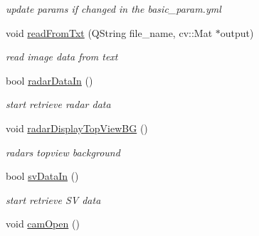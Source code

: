 \begin{DoxyCompactItemize}
\begin{DoxyCompactList}\small\item\em update params if changed in the basic\+\_\+param.\+yml \end{DoxyCompactList}\item 
\hypertarget{class_main_window_ab1ac23ed93488b126a11739c637a85ef}{}void \hyperlink{class_main_window_ab1ac23ed93488b126a11739c637a85ef}{read\+From\+Txt} (Q\+String file\+\_\+name, cv\+::\+Mat $\ast$output)\label{class_main_window_ab1ac23ed93488b126a11739c637a85ef}

\begin{DoxyCompactList}\small\item\em read image data from text \end{DoxyCompactList}\item 
\hypertarget{class_main_window_a4efa6f79ede7fbadc06f39adaa37830b}{}bool \hyperlink{class_main_window_a4efa6f79ede7fbadc06f39adaa37830b}{radar\+Data\+In} ()\label{class_main_window_a4efa6f79ede7fbadc06f39adaa37830b}

\begin{DoxyCompactList}\small\item\em start retrieve radar data \end{DoxyCompactList}\item 
\hypertarget{class_main_window_a76f1215df56775aa51065ee9559739ed}{}void \hyperlink{class_main_window_a76f1215df56775aa51065ee9559739ed}{radar\+Display\+Top\+View\+B\+G} ()\label{class_main_window_a76f1215df56775aa51065ee9559739ed}

\begin{DoxyCompactList}\small\item\em radar\textquotesingle{}s topview background \end{DoxyCompactList}\item 
\hypertarget{class_main_window_a1168419c7374e67813a4f845254953a5}{}bool \hyperlink{class_main_window_a1168419c7374e67813a4f845254953a5}{sv\+Data\+In} ()\label{class_main_window_a1168419c7374e67813a4f845254953a5}

\begin{DoxyCompactList}\small\item\em start retrieve S\+V data \end{DoxyCompactList}\item 
\hypertarget{class_main_window_a6d180da4257184902cf05a0062139549}{}void \hyperlink{class_main_window_a6d180da4257184902cf05a0062139549}{cam\+Open} ()\label{class_main_window_a6d180da4257184902cf05a0062139549}


\end{DoxyCompactItemize}
